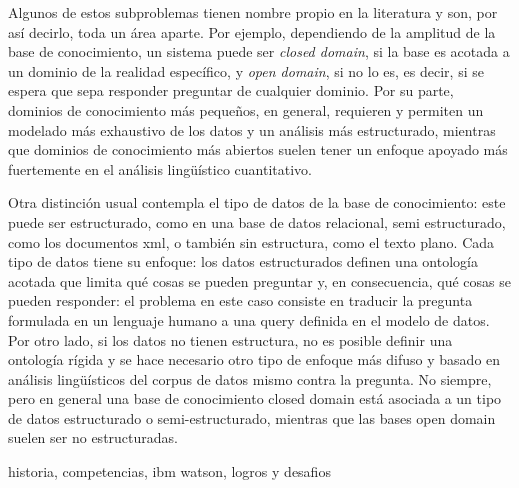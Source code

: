 \bigskip

Algunos de estos subproblemas tienen nombre propio en la literatura y son, por así decirlo, toda un área aparte. Por
ejemplo, dependiendo de la amplitud de la base de conocimiento, un
sistema puede ser \textit{closed domain}, si la base es acotada a un dominio de la realidad específico, y
\textit{open domain}, si no lo es, es decir, si se espera que sepa responder preguntar de cualquier dominio.
Por su parte, dominios de conocimiento más pequeños, en general, requieren y permiten un modelado más exhaustivo
de los datos y un análisis más estructurado, mientras que dominios de conocimiento más abiertos suelen
tener un enfoque apoyado más fuertemente en el análisis lingüístico cuantitativo.


\bigskip

Otra distinción usual contempla el tipo de datos de la base de
conocimiento: este puede ser estructurado, como en una base de datos
relacional, semi estructurado, como los documentos xml, o también sin
estructura, como el texto plano. Cada tipo de datos tiene su enfoque:
los datos estructurados definen una ontología acotada que limita
qué cosas se pueden preguntar y, en consecuencia, qué cosas se pueden responder: el
problema en este caso consiste en traducir la pregunta formulada en un lenguaje humano a una query
definida en el modelo de datos. Por otro lado, si los datos no
tienen estructura, no es posible definir una ontología rígida y se
hace necesario otro tipo de enfoque más difuso y basado en análisis
lingüísticos del corpus de datos mismo contra la pregunta. No siempre, 
pero en general una base de conocimiento closed domain está asociada
a un tipo de datos estructurado o semi-estructurado, mientras que las bases open domain
suelen ser no estructuradas.


{\color{red} historia, competencias, ibm watson, logros y desafios}

